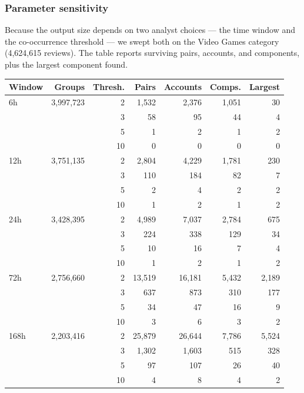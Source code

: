 \documentclass[12pt]{article}
\begin{document}
\subsubsection{Parameter sensitivity}
\label{sec:sensitivity}

Because the output size depends on two analyst choices --- the time window and
the co-occurrence threshold --- we swept both on the Video Games category
(4{,}624{,}615 reviews). The table reports surviving pairs, accounts, and
components, plus the largest component found.

\begin{center}
\begin{tabular}{@{}lrrrrrr@{}}
  \toprule
  \textbf{Window} & \textbf{Groups} & \textbf{Thresh.} & \textbf{Pairs} &
  \textbf{Accounts} & \textbf{Comps.} & \textbf{Largest} \\
  \midrule
  6h   & 3{,}997{,}723 & 2  & 1{,}532  & 2{,}376  & 1{,}051 & 30 \\
       &               & 3  & 58       & 95       & 44      & 4 \\
       &               & 5  & 1        & 2        & 1       & 2 \\
       &               & 10 & 0        & 0        & 0       & 0 \\
  \addlinespace
  12h  & 3{,}751{,}135 & 2  & 2{,}804  & 4{,}229  & 1{,}781 & 230 \\
       &               & 3  & 110      & 184      & 82      & 7 \\
       &               & 5  & 2        & 4        & 2       & 2 \\
       &               & 10 & 1        & 2        & 1       & 2 \\
  \addlinespace
  24h  & 3{,}428{,}395 & 2  & 4{,}989  & 7{,}037  & 2{,}784 & 675 \\
       &               & 3  & 224      & 338      & 129     & 34 \\
       &               & 5  & 10       & 16       & 7       & 4 \\
       &               & 10 & 1        & 2        & 1       & 2 \\
  \addlinespace
  72h  & 2{,}756{,}660 & 2  & 13{,}519 & 16{,}181 & 5{,}432 & 2{,}189 \\
       &               & 3  & 637      & 873      & 310     & 177 \\
       &               & 5  & 34       & 47       & 16      & 9 \\
       &               & 10 & 3        & 6        & 3       & 2 \\
  \addlinespace
  168h & 2{,}203{,}416 & 2  & 25{,}879 & 26{,}644 & 7{,}786 & 5{,}524 \\
       &               & 3  & 1{,}302  & 1{,}603  & 515     & 328 \\
       &               & 5  & 97       & 107      & 26      & 40 \\
       &               & 10 & 4        & 8        & 4       & 2 \\
  \bottomrule
\end{tabular}
\end{center}
\end{document}

